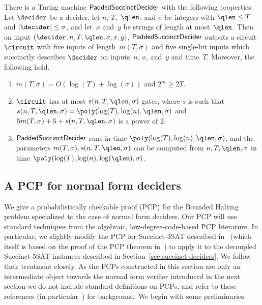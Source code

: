 \begin{proposition}
  \label{prop:explicit-padded-succinct-deciders}
  There is a Turing machine $\mathsf{PaddedSuccinctDecider}$ with the following
  properties.
  Let $\decider$ be a decider, let $n$, $T$,~$\qlen$, and $\sigma$ be integers
  with $\qlen \leq T$ and $|\decider| \leq \sigma$, and let~$x$ and~$y$ be
  strings of length at most~$\qlen$.
  Then on input $(\decider, n, T, \qlen, \sigma, x, y)$,
  $\mathsf{PaddedSuccinctDecider}$ outputs a circuit~$\circuit$ with five inputs of
  length~$m(T,\sigma)$ and five single-bit inputs which succinctly describes
  $\decider$ on inputs~$n$, $x$, and~$y$ and time~$T$.
  Moreover, the following hold.
  \begin{enumerate}
  \item $m(T,\sigma) = O(\log(T)+ \log(\sigma))$ and $2^m \geq 2T$.
  \item $\circuit$ has at most $s(n,T,\qlen,\sigma)$ gates, where $s$
    is such that $s(n,T,\qlen, \sigma) = \poly(\log(T), \log(n),
    \qlen,\sigma)$ and $5m(T, \sigma) + 5 + s(n, T, \qlen,\sigma)$ is
    a power of $2$.
  \item $\mathsf{PaddedSuccinctDecider}$ runs in time $\poly(\log(T), \log(n),
    \qlen,\sigma)$, and the parameters $m(T,\sigma), s(n, T, \qlen, \sigma)$ can
    be computed from $n, T, \qlen,\sigma$ in time $\poly(\log(T), \log(n),
    \log(\qlen),\sigma)$.
  \end{enumerate}
\end{proposition}

\subsection{A PCP for normal form deciders}
\label{sec:pcp-cktval-new}

We give a probabilistically checkable proof (PCP) for the Bounded Halting
problem specialized to the case of normal form deciders.
Our PCP will use standard techniques from the algebraic, low-degree-code-based
PCP literature.
In particular, we slightly modify the PCP for Succinct-3SAT described
in~\cite[Section 11]{NW19} (which itself is based on the proof of the PCP
theorem in~\cite{harsha2004robust}) to apply it to the decoupled Succinct-5SAT
instances described in Section~\ref{sec:succinct-deciders}.
We follow their treatment closely.
As the PCPs constructed in this section are only an intermediate object towards
the normal form verifier introduced in the next section we do not include
standard definitions on PCPs, and refer to these references (in
particular~\cite{harsha2004robust}) for background.
We begin with some preliminaries.

